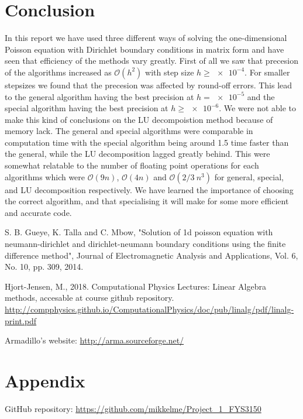\documentclass[american,a4paper,12pt]{article}
\begin{document}
\section{Conclusion}
In this report we have used three different ways of solving the one-dimensional Poisson equation with Dirichlet boundary conditions in matrix form and have seen that efficiency of the methods vary greatly. First of all we saw that precesion of the algorithms increased as $\mathcal{O}(h^2)$ with step size $h \ge \num{e-4}$. For smaller stepsizes we found that the precesion was affected by round-off errors. This lead to the general algorithm having the best precision at $h = \num{e-5}$ and the special algorithm having the best precision at $h \ge \num{e-6}$. We were not able to make this kind of conclusions on the LU decompoistion method because of memory lack. The general and special algorithms were comparable in computation time with the special algorithm being around 1.5 time faster than the general, while the LU decomposition lagged greatly behind. This were somewhat relatable to the number of floating point operations for each algorithms which were $\mathcal{O}(9n)$, $\mathcal{O}(4n)$ and $\mathcal{O}(2/3\ n^3)$ for general, special, and LU decomposition respectively. We have learned the importance of choosing the correct algorithm, and that specialising it will make for some more efficient and accurate code.


\begin{thebibliography}{9}
   S. B. Gueye, K. Talla and C. Mbow, "Solution of 1d poisson equation with neumann-dirichlet and dirichlet-neumann boundary conditions using the finite difference method", Journal of Electromagnetic Analysis and Applications, Vol. 6, No. 10, pp. 309, 2014.

   Hjort-Jensen, M., 2018. Computational Physics Lectures: Linear Algebra methods,  accesable at course github repository. \url{http://compphysics.github.io/ComputationalPhysics/doc/pub/linalg/pdf/linalg-print.pdf}

   Armadillo's website: \url{http://arma.sourceforge.net/}


\end{thebibliography}
\section*{Appendix}
GitHub repository: \url{https://github.com/mikkelme/Project_1_FYS3150}



\end{document}

